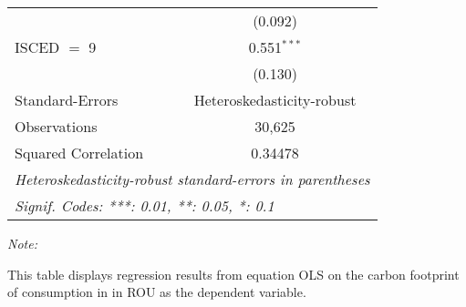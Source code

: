 \begin{table}[htbp!]
\begin{adjustbox}{width = 1\textwidth, max height = 0.95\textheight, center}
\begin{threeparttable}[b]
\begin{tabular}{lc}
                                & (0.092)\\   
            ISCED $=$ 9         & 0.551$^{***}$\\   
                                & (0.130)\\   
            \midrule 
            Standard-Errors     & Heteroskedasticity-robust \\   
            Observations        & 30,625\\  
            Squared Correlation & 0.34478\\  
            \midrule \midrule
            \multicolumn{2}{l}{\emph{Heteroskedasticity-robust standard-errors in parentheses}}\\
            \multicolumn{2}{l}{\emph{Signif. Codes: ***: 0.01, **: 0.05, *: 0.1}}\\
         \end{tabular}
         
         \begin{tablenotes}\item \medskip \textit{Note:}
            \item This table displays regression results from equation OLS on the carbon footprint of consumption in  in ROU as the dependent variable.  
         \end{tablenotes}
      \end{threeparttable}
   \end{adjustbox}
\end{table}


